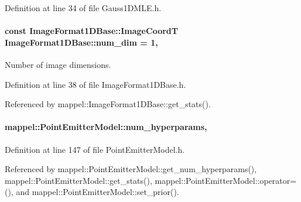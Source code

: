 Definition at line 34 of file Gauss1\+D\+M\+L\+E.\+h.

\paragraph[{\texorpdfstring{num\+\_\+dim}{num_dim}}]{\setlength{\rightskip}{0pt plus 5cm}const {\bf Image\+Format1\+D\+Base\+::\+Image\+CoordT} Image\+Format1\+D\+Base\+::num\+\_\+dim = 1\hspace{0.3cm}{\ttfamily [static]}, {\ttfamily [inherited]}}\hypertarget{classmappel_1_1ImageFormat1DBase_af81159de9010c3618d2f69349c1f2368}{}\label{classmappel_1_1ImageFormat1DBase_af81159de9010c3618d2f69349c1f2368}
Number of image dimensions. 

Definition at line 38 of file Image\+Format1\+D\+Base.\+h.



Referenced by mappel\+::\+Image\+Format1\+D\+Base\+::get\+\_\+stats().

\paragraph[{\texorpdfstring{num\+\_\+hyperparams}{num_hyperparams}}]{ mappel\+::\+Point\+Emitter\+Model\+::num\+\_\+hyperparams\hspace{0.3cm}{\ttfamily [protected]}, {\ttfamily [inherited]}}\hypertarget{classmappel_1_1PointEmitterModel_ab2423214fdd81c8212118770b5b17b1f}{}\label{classmappel_1_1PointEmitterModel_ab2423214fdd81c8212118770b5b17b1f}


Definition at line 147 of file Point\+Emitter\+Model.\+h.



Referenced by mappel\+::\+Point\+Emitter\+Model\+::get\+\_\+num\+\_\+hyperparams(), mappel\+::\+Point\+Emitter\+Model\+::get\+\_\+stats(), mappel\+::\+Point\+Emitter\+Model\+::operator=(), and mappel\+::\+Point\+Emitter\+Model\+::set\+\_\+prior().

